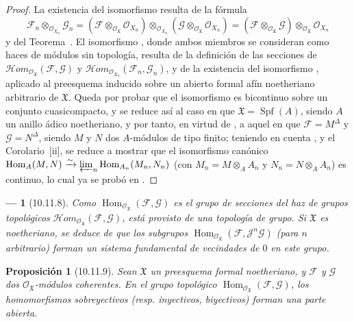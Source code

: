 \documentclass[oneside]{amsart}
\theoremstyle{ega-env-style}
\newtheorem*{env}{---}
\theoremstyle{ega-thm-env-style}
\newtheorem*{proposition}{Proposición}
\theoremstyle{ega-defn-env-style}
\let\EGAOriginalLabel\label
\renewcommand{\label}[1]{\phantomsection\EGAOriginalLabel{#1}}
\begin{document}
\begin{proof}
La existencia del isomorfismo  resulta de la fórmula
\[
  \mathscr{F}_n\otimes_{\mathscr{O}_{X_n}}\mathscr{G}_n
  =
  (\mathscr{F}\otimes_{\mathscr{O}_{\mathfrak{X}}}
  \mathscr{O}_{X_n})
  \otimes_{\mathscr{O}_{X_n}}
  (\mathscr{G}\otimes_{\mathscr{O}_{\mathfrak{X}}}
  \mathscr{O}_{X_n})
  =
  (\mathscr{F}\otimes_{\mathscr{O}_{\mathfrak{X}}}\mathscr{G})
  \otimes_{\mathscr{O}_{\mathfrak{X}}}\mathscr{O}_{X_n}
\]
y del Teorema~.
El isomorfismo , donde ambos miembros se consideran como haces de módulos sin topología, resulta de la definición de las secciones de $\mathscr{H}\!om_{\mathscr{O}_{\mathfrak{X}}}
(\mathscr{F},\mathscr{G})$ y $\mathscr{H}\!om_{\mathscr{O}_{X_n}}(\mathscr{F}_n,\mathscr{G}_n)$, y de la existencia del isomorfismo , aplicado al preesquema inducido sobre un abierto formal afín noetheriano arbitrario de $\mathfrak{X}$.
Queda por probar que el isomorfismo  es bicontinuo sobre un conjunto cuasicompacto, y se reduce así al caso en que $\mathfrak{X}=\operatorname{Spf}(A)$, siendo $A$ un anillo ádico noetheriano, y por tanto, en virtud de , a aquel en que $\mathscr{F}=M^\Delta$ y $\mathscr{G}=N^\Delta$, siendo $M$ y $N$ dos $A$-módulos de tipo finito; teniendo en cuenta ,  y el Corolario~[ii], se reduce a mostrar que el isomorfismo canónico $\operatorname{Hom}_A(M,N)\xrightarrow{\sim}
\varprojlim_n\operatorname{Hom}_{A_n}(M_n,N_n)$ (con $M_n=M\otimes_A A_n$ y $N_n=N\otimes_A A_n$) es continuo, lo cual ya se probó en .
\end{proof}

\begin{env}[10.11.8]
\label{I.10.11.8}
Como $\operatorname{Hom}_{\mathscr{O}_{\mathfrak{X}}}
(\mathscr{F},\mathscr{G})$ es el grupo de secciones del haz de grupos topológicos $\mathscr{H}\!om_{\mathscr{O}_{\mathfrak{X}}}
(\mathscr{F},\mathscr{G})$, está provisto de una topología de grupo.
Si $\mathfrak{X}$ es \emph{noetheriano}, se deduce de  que los subgrupos $\operatorname{Hom}_{\mathscr{O}_{\mathfrak{X}}}
(\mathscr{F},\mathscr{J}^n\mathscr{G})$ (para $n$ arbitrario) forman un sistema fundamental de vecindades de $0$ en este grupo.
\end{env}

\begin{proposition}[10.11.9]
\label{I.10.11.9}
Sean $\mathfrak{X}$ un preesquema formal noetheriano, y $\mathscr{F}$ y $\mathscr{G}$ dos $\mathscr{O}_{\mathfrak{X}}$-módulos coherentes.
En el grupo topológico $\operatorname{Hom}_{\mathscr{O}_{\mathfrak{X}}}
(\mathscr{F},\mathscr{G})$, los homomorfismos sobreyectivos \textup{(resp.} inyectivos, biyectivos) forman una parte abierta.
\end{proposition}
\end{document}
